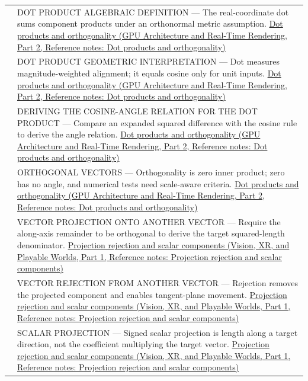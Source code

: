 {\begin{longtable}[]{@{}
  >{\raggedright\arraybackslash}p{}
  >{\raggedright\arraybackslash}p{}@{}}
534 & DOT PRODUCT ALGEBRAIC DEFINITION --- The real-coordinate dot sums component products under an orthonormal metric assumption. \href{../06-GPU-Architecture-and-Real-Time-Rendering-P02/main.pdf\#nameddest=appendix-8bc4e8fc547c}{Dot products and orthogonality (GPU Architecture and Real-Time Rendering, Part 2, Reference notes: Dot products and orthogonality)} \\
535 & DOT PRODUCT GEOMETRIC INTERPRETATION --- Dot measures magnitude-weighted alignment; it equals cosine only for unit inputs. \href{../06-GPU-Architecture-and-Real-Time-Rendering-P02/main.pdf\#nameddest=appendix-8bc4e8fc547c}{Dot products and orthogonality (GPU Architecture and Real-Time Rendering, Part 2, Reference notes: Dot products and orthogonality)} \\
536 & DERIVING THE COSINE-ANGLE RELATION FOR THE DOT PRODUCT --- Compare an expanded squared difference with the cosine rule to derive the angle relation. \href{../06-GPU-Architecture-and-Real-Time-Rendering-P02/main.pdf\#nameddest=appendix-8bc4e8fc547c}{Dot products and orthogonality (GPU Architecture and Real-Time Rendering, Part 2, Reference notes: Dot products and orthogonality)} \\
537 & ORTHOGONAL VECTORS --- Orthogonality is zero inner product; zero has no angle, and numerical tests need scale-aware criteria. \href{../06-GPU-Architecture-and-Real-Time-Rendering-P02/main.pdf\#nameddest=appendix-8bc4e8fc547c}{Dot products and orthogonality (GPU Architecture and Real-Time Rendering, Part 2, Reference notes: Dot products and orthogonality)} \\
538 & VECTOR PROJECTION ONTO ANOTHER VECTOR --- Require the along-axis remainder to be orthogonal to derive the target squared-length denominator. \href{../07-Vision-XR-and-Playable-Worlds-P01/main.pdf\#nameddest=appendix-505a502c372a}{Projection rejection and scalar components (Vision, XR, and Playable Worlds, Part 1, Reference notes: Projection rejection and scalar components)} \\
539 & VECTOR REJECTION FROM ANOTHER VECTOR --- Rejection removes the projected component and enables tangent-plane movement. \href{../07-Vision-XR-and-Playable-Worlds-P01/main.pdf\#nameddest=appendix-505a502c372a}{Projection rejection and scalar components (Vision, XR, and Playable Worlds, Part 1, Reference notes: Projection rejection and scalar components)} \\
540 & SCALAR PROJECTION --- Signed scalar projection is length along a target direction, not the coefficient multiplying the target vector. \href{../07-Vision-XR-and-Playable-Worlds-P01/main.pdf\#nameddest=appendix-505a502c372a}{Projection rejection and scalar components (Vision, XR, and Playable Worlds, Part 1, Reference notes: Projection rejection and scalar components)} \\

\end{longtable}}
